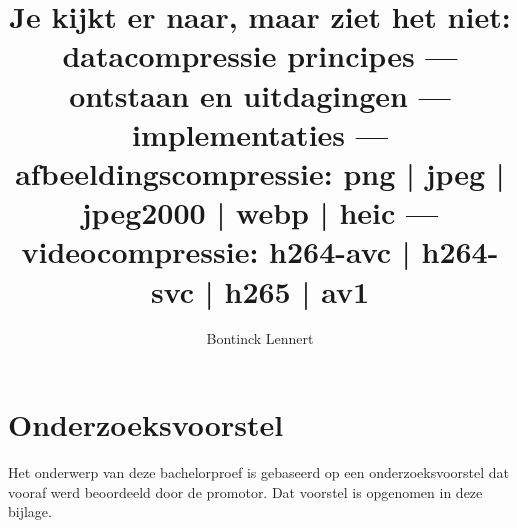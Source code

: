 \documentclass{bachproef-tin}
\title{Je kijkt er naar, maar ziet het niet: datacompressie	principes --- ontstaan en uitdagingen --- implementaties --- \gls{afbeeldingscompressie}: \gls{png} | \gls{jpeg} | \gls{jpeg2000} | \gls{webp} | \gls{heic} --- \gls{videocompressie}:  \gls{h264-avc} | \gls{h264-svc} | \gls{h265} | \gls{av1}}
\author{Bontinck Lennert}
\begin{document}


\inserttitlepage

\usechapterimagefalse



\pagestyle{empty} %
\tableofcontents  %
\cleardoublepage  %
\pagestyle{fancy} %
















\appendix
\renewcommand{\chaptername}{Appendix}


\chapter{Onderzoeksvoorstel}

Het onderwerp van deze bachelorproef is gebaseerd op een onderzoeksvoorstel dat vooraf werd beoordeeld door de promotor. Dat voorstel is opgenomen in deze bijlage.



%


\nocite{*}
\printbibliography[heading=bibintoc]
\end{document}
